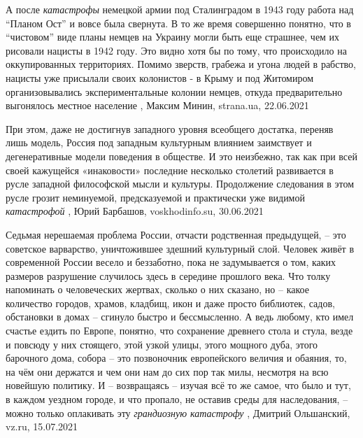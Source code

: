  
 
 
 
 

А после \emph{катастрофы} немецкой армии под Сталинградом в 1943 году работа над
\enquote{Планом Ост} и вовсе была свернута.  В то же время совершенно понятно, что в
\enquote{чистовом} виде планы немцев на Украину могли быть еще страшнее, чем их
рисовали нацисты в 1942 году. Это видно хотя бы по тому, что происходило на
оккупированных территориях.  Помимо зверств, грабежа и угона людей в рабство,
нацисты уже присылали своих колонистов - в Крыму и под Житомиром
организовывались экспериментальные колонии немцев, откуда предварительно
выгонялось местное население
, Максим Минин, strana.ua, 22.06.2021

При этом, даже не достигнув западного уровня всеобщего достатка, переняв лишь
модель, Россия под западным культурным влиянием заимствует и дегенеративные
модели поведения в обществе. И это неизбежно, так как при всей своей кажущейся
«инаковости» последние несколько столетий развивается в русле западной
философской мысли и культуры. Продолжение следования в этом русле грозит
неминуемой, предсказуемой и практически уже видимой \emph{катастрофой}
, 
Юрий Барбашов, voskhodinfo.su, 30.06.2021

Седьмая нерешаемая проблема России, отчасти родственная предыдущей, – это
советское варварство, уничтожившее здешний культурный слой.  Человек живёт в
современной России весело и беззаботно, пока не задумывается о том, каких
размеров разрушение случилось здесь в середине прошлого века. Что толку
напоминать о человеческих жертвах, сколько о них сказано, но – какое количество
городов, храмов, кладбищ, икон и даже просто библиотек, садов, обстановки в
домах – сгинуло быстро и бессмысленно. А ведь любому, кто имел счастье ездить
по Европе, понятно, что сохранение древнего стола и стула, везде и повсюду у
них стоящего, этой узкой улицы, этого мощного дуба, этого барочного дома,
собора – это позвоночник европейского величия и обаяния, то, на чём они
держатся и чем они нам до сих пор так милы, несмотря на всю новейшую политику.
И – возвращаясь – изучая всё то же самое, что было и тут, в каждом уездном
городе, и что пропало, не оставив среды для наследования, – можно только
оплакивать эту \emph{грандиозную катастрофу}
, 
Дмитрий Ольшанский, vz.ru, 15.07.2021

